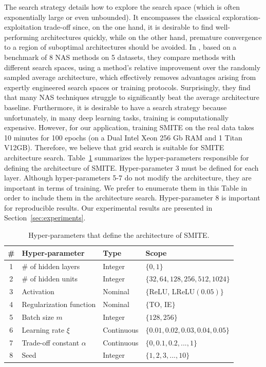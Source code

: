 \documentclass{article}
\begin{document}
The search strategy details how to explore the search space
(which is often exponentially large or even unbounded). It encompasses the classical exploration-exploitation trade-off since, on the one hand, it is desirable to find
well-performing architectures quickly, while on the other hand, premature convergence to a region of suboptimal architectures should be avoided. In \cite{yang2019evaluation},  based on a benchmark of 8 NAS methods on 5 datasets, they compare methods with different search spaces, using a method’s relative improvement over the randomly sampled average architecture, which effectively removes advantages arising from expertly engineered search spaces or training protocols. Surprisingly, they find that many NAS techniques struggle to significantly beat the average architecture baseline. Furthermore, it is desirable to have a search strategy because unfortunately, in many deep learning tasks, training is computationally expensive. However, for our application, training SMITE on the real data takes 10 minutes for 100 epochs (on a Dual Intel Xeon 256 Gb RAM and 1 Titan V12GB). Therefore, we believe that grid search is suitable for SMITE architecture search. Table~\ref{tab:NAS} summarizes the hyper-parameters responsible for defining the architecture of SMITE. Hyper-parameter 3 must be defined for each layer. Although hyper-parameters 5-7 do not modify the architecture, they are important in terms of training. We prefer to enumerate them in this Table in order to include them in the architecture search. Hyper-parameter 8 is important for reproducible results. Our experimental results are presented in Section~\ref{sec:experiments}.

\begin{table}[htb]
    \caption{Hyper-parameters that define the architecture of SMITE.}
    \centering
    \begin{tabular}{|c||l|l|l|}
         \hline
         \# &  Hyper-parameter & Type & Scope\\
         \hline
         1 & \# of hidden layers & Integer & $\{0,1\}$\\
         2 & \# of hidden units & Integer & $\{32,64,128,256,512,1024\}$\\
         3 & Activation & Nominal & $\{$ReLU, LReLU$(0.05)\}$\\
         4 & Regularization function & Nominal & $\{$TO, IE$\}$ \\
         5 & Batch size $m$ & Integer & $\{128,256\}$ \\
         6 & Learning rate $\xi$ & Continuous & $\{0.01,0.02,0.03,0.04,0.05\}$ \\
         7 & Trade-off constant $\alpha$ & Continuous & $\{0,0.1,0.2,...,1\}$ \\
         8 & Seed & Integer & $\{1,2,3,...,10\}$ \\
         \hline
    \end{tabular}
    \label{tab:NAS}
\end{table}
\end{document}

